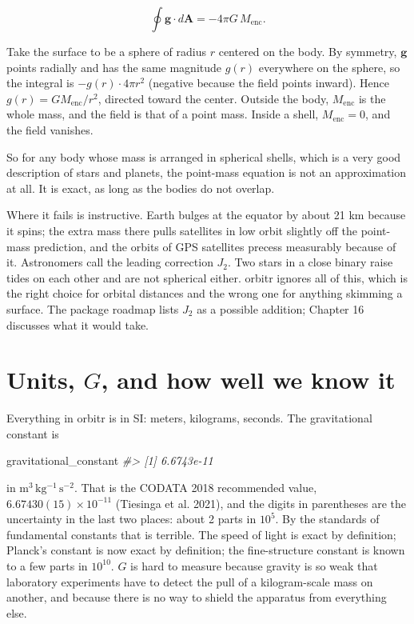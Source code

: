 \documentclass[
  10.5pt,
  letterpaper,
]{scrbook}
\newenvironment{Shaded}{\begin{snugshade}}{\end{snugshade}}
\newcommand{\CommentTok}[1]{\textcolor[rgb]{0.00,0.00,0.00}{\textit{#1}}}
\newcommand{\NormalTok}[1]{\textcolor[rgb]{0.00,0.00,0.00}{#1}}
\theoremstyle{plain}
\theoremstyle{remark}
\begin{document}
\[
\oint \mathbf{g}\cdot d\mathbf{A} = -4\pi G\,M_{\mathrm{enc}}.
\]

Take the surface to be a sphere of radius \(r\) centered on the body. By
symmetry, \(\mathbf{g}\) points radially and has the same magnitude
\(g(r)\) everywhere on the sphere, so the integral is
\(-g(r)\cdot 4\pi r^2\) (negative because the field points inward).
Hence \(g(r) = G M_{\mathrm{enc}}/r^2\), directed toward the center.
Outside the body, \(M_{\mathrm{enc}}\) is the whole mass, and the field
is that of a point mass. Inside a shell, \(M_{\mathrm{enc}} = 0\), and
the field vanishes.

So for any body whose mass is arranged in spherical shells, which is a
very good description of stars and planets, the point-mass equation is
not an approximation at all. It is exact, as long as the bodies do not
overlap.

Where it fails is instructive. Earth bulges at the equator by about 21
km because it spins; the extra mass there pulls satellites in low orbit
slightly off the point-mass prediction, and the orbits of GPS satellites
precess measurably because of it. Astronomers call the leading
correction \(J_2\). Two stars in a close binary raise tides on each
other and are not spherical either. orbitr ignores all of this, which is
the right choice for orbital distances and the wrong one for anything
skimming a surface. The package roadmap lists \(J_2\) as a possible
addition; Chapter 16 discusses what it would take.

\section{\texorpdfstring{Units, \(G\), and how well we know
it}{Units, G, and how well we know it}}\label{units-g-and-how-well-we-know-it}

Everything in orbitr is in SI: meters, kilograms, seconds. The
gravitational constant is

\begin{Shaded}
\begin{Highlighting}[]
\NormalTok{gravitational\_constant}
\CommentTok{\#\textgreater{} [1] 6.6743e{-}11}
\end{Highlighting}
\end{Shaded}

in \(\mathrm{m^3\,kg^{-1}\,s^{-2}}\). That is the CODATA 2018
recommended value, \(6.67430(15)\times10^{-11}\) (Tiesinga et al. 2021),
and the digits in parentheses are the uncertainty in the last two
places: about 2 parts in \(10^5\). By the standards of fundamental
constants that is terrible. The speed of light is exact by definition;
Planck's constant is now exact by definition; the fine-structure
constant is known to a few parts in \(10^{10}\). \(G\) is hard to
measure because gravity is so weak that laboratory experiments have to
detect the pull of a kilogram-scale mass on another, and because there
is no way to shield the apparatus from everything else.
\end{document}

